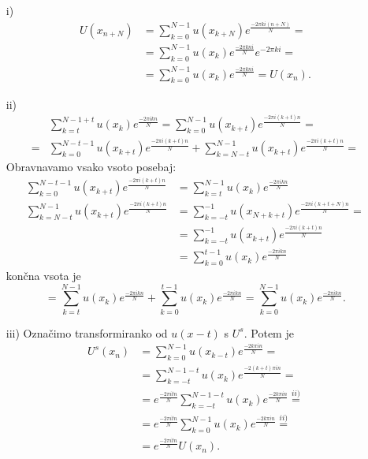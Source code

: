 \documentclass[mat2, tisk]{fmfdelo}
\begin{document}
\begin{dokaz}
  \hfill
\begin{enumerate}
  \item[i)]
  \begin{align*}
    U(x_{n+N}) &= \sum_{k=0}^{N-1} u(x_{k+N}) e^{\frac{-2\pi k i(n+N)}{N}} = \\
    &= \sum_{k=0}^{N-1} u(x_k) e^{\frac{-2\pi k n i}{N}} e^{-2\pi k i} = \\
    &= \sum_{k=0}^{N-1} u(x_k) e^{\frac{-2\pi k n i}{N}} = U(x_n).
  \end{align*}
\newpage
  \item[ii)]
  \begin{align*}
    &\sum_{k=t}^{N-1 + t} u(x_k) e^{\frac{-2\pi i k n}{N}} = \sum_{k=0}^{N-1} u(x_{k+t}) e^{\frac{-2\pi i (k+t) n}{N}} = \\
    =&\sum_{k=0}^{N-t-1} u(x_{k+t}) e^{\frac{-2\pi i (k+t) n}{N}} + 
    \sum_{k=N-t}^{N-1} u(x_{k+t}) e^{\frac{-2\pi i (k+t) n}{N}} = 
  \end{align*}
Obravnavamo vsako vsoto posebaj: 
\begin{align*}
\sum_{k=0}^{N-t-1} u(x_{k+t}) e^{\frac{-2\pi i (k+t) n}{N}} &= 
\sum_{k=t}^{N-1} u(x_{k}) e^{\frac{-2\pi i k n}{N}}\\[5mm]
  \sum_{k=N-t}^{N-1} u(x_{k+t}) e^{\frac{-2\pi i (k+t) n}{N}} &= 
  \sum_{k=-t}^{-1} u(x_{N+k+t}) e^{\frac{-2\pi i (k+t+N) n}{N}} = \\
  &= \sum_{k=-t}^{-1} u(x_{k+t}) e^{\frac{-2\pi i (k+t) n}{N}} \\
  &= \sum_{k=0}^{t-1} u(x_{k}) e^{\frac{-2\pi i k n}{N}}
\end{align*}
končna vsota je 
$$
= \sum_{k=t}^{N-1} u(x_{k}) e^{\frac{-2\pi i k n}{N}} + \sum_{k=0}^{t-1} u(x_{k}) e^{\frac{-2\pi i k n}{N}} = 
\sum_{k=0}^{N-1} u(x_{k}) e^{\frac{-2\pi i k n}{N}}.
$$

\item[iii)] 
Označimo transformiranko od $u(x-t)$ s $U^s$. Potem je 
  \begin{align*}
    U^s(x_{n}) &= \sum_{k=0}^{N-1} u(x_{k-t}) e^{\frac{-2k \pi i n}{N}} = \\
    &= \sum_{k=-t}^{N-1-t} u(x_{k}) e^{\frac{-2(k+t) \pi i n}{N}} = \\
    &= e^{\frac{-2\pi i t n}{N}} \sum_{k=-t}^{N-1-t} u(x_{k}) e^{\frac{-2k \pi i n}{N}} \stackrel{ii)}{=} \\
    &=e^{\frac{-2\pi i t n}{N}} \sum_{k=0}^{N-1} u(x_{k}) e^{\frac{-2k \pi i n}{N}} \stackrel{ii)}{=} \\
    &= e^{\frac{-2\pi i t n}{N}} U(x_n).
  \end{align*}


\end{enumerate}
\end{dokaz}
\end{document}
